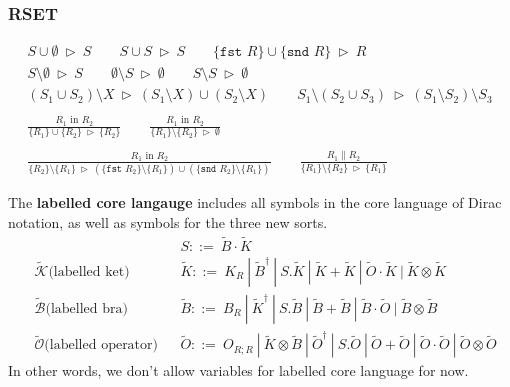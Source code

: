 \documentclass[manuscript, review, timestamp]{acmart}
\newcommand*{\fst}{\texttt{fst }}
\newcommand*{\snd}{\texttt{snd }}
\newcommand*{\reduce}{\ \triangleright\ }
\begin{document}
\subsubsection*{\textsf{RSET}}
\begin{gather*}
  S \cup \emptyset \reduce S
  \qquad
  S \cup S \reduce S
  \qquad
  \{ \fst R \} \cup \{ \snd R \} \reduce R \\
  S \setminus \emptyset \reduce S
  \qquad
  \emptyset \setminus S \reduce \emptyset
  \qquad
  S \setminus S \reduce \emptyset \\
  (S_1 \cup S_2) \setminus X \reduce (S_1 \setminus X) \cup (S_2 \setminus X)
  \qquad
  S_1 \setminus (S_2 \cup S_3) \reduce (S_1 \setminus S_2) \setminus S_3 \\
  \\
  \frac{ R_1 \textrm{ in } R_2 }{ \{ R_1 \} \cup \{ R_2 \} \reduce \{ R_2 \} }
  \qquad
  \frac{ R_1 \textrm{ in } R_2 }{ \{ R_1 \} \setminus \{ R_2 \} \reduce \emptyset } \\
  \\
  \frac{ R_1 \textrm{ in } R_2 }{ \{R_2\} \setminus \{R_1\} \reduce (\{\fst R_2\} \setminus \{R_1\}) \cup (\{\snd R_2\} \setminus \{R_1\})}
  \qquad
  \frac{R_1 \| R_2}{ \{ R_1 \} \setminus \{ R_2 \} \reduce \{ R_1 \}} 
\end{gather*}

\begin{definition}
  The \textbf{labelled core langauge} includes all symbols in the core language of Dirac notation, as well as symbols for the three new sorts.
  \begin{align*}
    & && S ::=\ \tilde{B} \cdot \tilde{K} \\
    & \tilde{\mathcal{K}}\text{(labelled ket)}&& \tilde{K} ::=\ K_{R}\ |\ \tilde{B}^\dagger\ |\ S.\tilde{K}\ |\ \tilde{K} + \tilde{K}\ |\ \tilde{O} \cdot \tilde{K}\ |\ \tilde{K} \otimes \tilde{K} \\
    & \tilde{\mathcal{B}}\text{(labelled bra)} && \tilde{B} ::=\ B_{R}\ |\ \tilde{K}^\dagger\ |\ S.\tilde{B}\ |\ \tilde{B} + \tilde{B}\ |\ \tilde{B} \cdot \tilde{O}\ |\ \tilde{B} \otimes \tilde{B} \\
    & \tilde{\mathcal{O}}\text{(labelled operator)} &&\tilde{O} ::=\ O_{R; R}\ |\ \tilde{K}\otimes\tilde{B}\ |\ \tilde{O}^\dagger\ |\ S.\tilde{O}\ |\ \tilde{O} + \tilde{O}\ |\ \tilde{O} \cdot \tilde{O}\ |\ \tilde{O} \otimes \tilde{O}
  \end{align*}
  In other words, we don't allow variables for labelled core language for now.
\end{definition}
\end{document}
